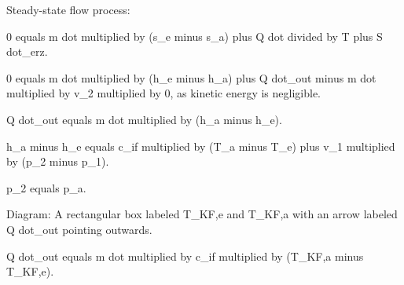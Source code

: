 Steady-state flow process:  

0 equals m dot multiplied by (s_e minus s_a) plus Q dot divided by T plus S dot_erz.  

0 equals m dot multiplied by (h_e minus h_a) plus Q dot_out minus m dot multiplied by v_2 multiplied by 0, as kinetic energy is negligible.  

Q dot_out equals m dot multiplied by (h_a minus h_e).  

h_a minus h_e equals c_if multiplied by (T_a minus T_e) plus v_1 multiplied by (p_2 minus p_1).  

p_2 equals p_a.  

Diagram: A rectangular box labeled T_KF,e and T_KF,a with an arrow labeled Q dot_out pointing outwards.  

Q dot_out equals m dot multiplied by c_if multiplied by (T_KF,a minus T_KF,e).